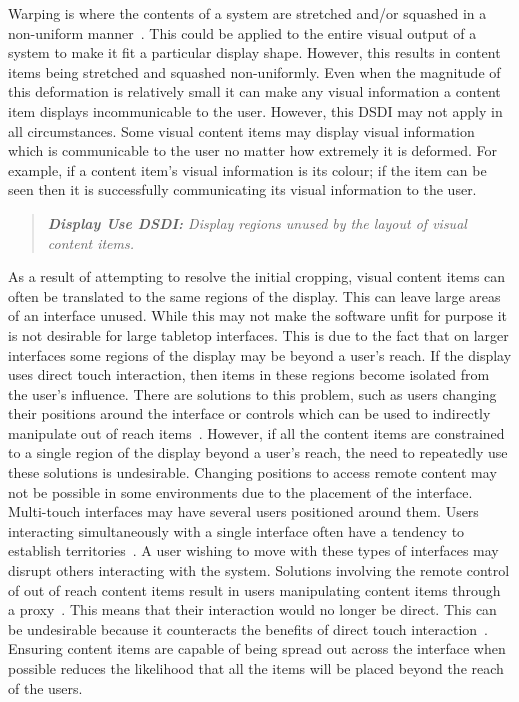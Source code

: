 \documentclass[review,5p,times,twocolumn]{elsarticle}
\begin{document}
Warping is where the contents of a system are stretched and/or squashed in a non-uniform manner~\cite{Milliron2002}.
This could be applied to the entire visual output of a system to make it fit a particular display shape.
However, this results in content items being stretched and squashed non-uniformly.
Even when the magnitude of this deformation is relatively small it can make any visual information a content item displays incommunicable to the user.
However, this \ac{DSDI} may not apply in all circumstances.
Some visual content items may display visual information which is communicable to the user no matter how extremely it is deformed.
For example, if a content item's visual information is its colour; if the item can be seen then it is successfully communicating its visual information to the user.

\begin{quote}\emph{\textbf{Display Use \ac{DSDI}:} Display regions unused by the layout of visual content items.}\end{quote}


As a result of attempting to resolve the initial cropping, visual content items can often be translated to the same regions of the display.
This can leave large areas of an interface unused.
While this may not make the software unfit for purpose it is not desirable for large tabletop interfaces.
This is due to the fact that on larger interfaces some regions of the display may be beyond a user's reach.
If the display uses direct touch interaction, then items in these regions become isolated from the user's influence.
There are solutions to this problem, such as users changing their positions around the interface or controls which can be used to indirectly manipulate out of reach items~\cite{Ryall2006a}.
However, if all the content items are constrained to a single region of the display beyond a user's reach, the need to repeatedly use these solutions is undesirable.
Changing positions to access remote content may not be possible in some environments due to the placement of the interface.
Multi-touch interfaces may have several users positioned around them.
Users interacting simultaneously with a single interface often have a tendency to establish territories~\cite{scott2004}.
A user wishing to move with these types of interfaces may disrupt others interacting with the system.
Solutions involving the remote control of out of reach content items result in users manipulating content items through a proxy~\cite{Smith11}.
This means that their interaction would no longer be direct.
This can be undesirable because it counteracts the benefits of direct touch interaction~\cite{Schoning2008}.
Ensuring content items are capable of being spread out across the interface when possible reduces the likelihood that all the items will be placed beyond the reach of the users.
\end{document}
